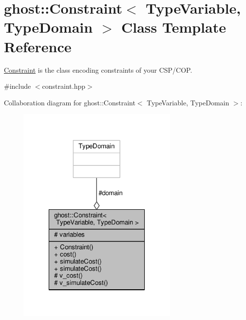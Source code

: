 \hypertarget{classghost_1_1Constraint}{\section{ghost\-:\-:Constraint$<$ Type\-Variable, Type\-Domain $>$ Class Template Reference}
\label{classghost_1_1Constraint}
}


\hyperlink{classghost_1_1Constraint}{Constraint} is the class encoding constraints of your C\-S\-P/\-C\-O\-P.  




{\ttfamily \#include $<$constraint.\-hpp$>$}



Collaboration diagram for ghost\-:\-:Constraint$<$ Type\-Variable, Type\-Domain $>$\-:
\nopagebreak
\begin{figure}[H]
\begin{center}
\leavevmode
\includegraphics[width=226pt]{classghost_1_1Constraint__coll__graph}
\end{center}
\end{figure}

